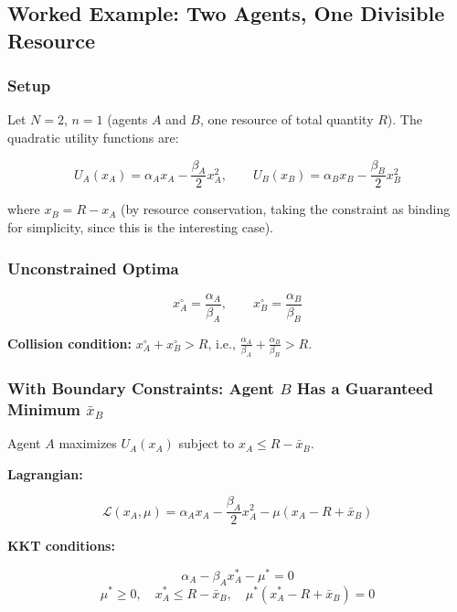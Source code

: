 \documentclass[11pt]{article}
\theoremstyle{plain}
\theoremstyle{definition}
\theoremstyle{remark}
\let\origsubsection\subsection
\renewcommand{\subsection}{\needspace{7\baselineskip}\origsubsection}
\let\origsubsubsection\subsubsection
\renewcommand{\subsubsection}{\needspace{4\baselineskip}\origsubsubsection}
\begin{document}
\subsection{Worked Example: Two Agents, One Divisible
Resource}\label{worked-example-two-agents-one-divisible-resource}

\subsubsection{Setup}\label{setup}

Let \(N = 2\), \(n = 1\) (agents \(A\) and \(B\), one resource of total
quantity \(R\)). The quadratic utility functions are:

\[U_A(x_A) = \alpha_A x_A - \frac{\beta_A}{2} x_A^2, \qquad U_B(x_B) = \alpha_B x_B - \frac{\beta_B}{2} x_B^2\]

where \(x_B = R - x_A\) (by resource conservation, taking the constraint
as binding for simplicity, since this is the interesting case).

\subsubsection{Unconstrained Optima}\label{unconstrained-optima}

\[x_A^{\circ} = \frac{\alpha_A}{\beta_A}, \qquad x_B^{\circ} = \frac{\alpha_B}{\beta_B}\]

\textbf{Collision condition:} \(x_A^{\circ} + x_B^{\circ} > R\), i.e.,
\(\frac{\alpha_A}{\beta_A} + \frac{\alpha_B}{\beta_B} > R\).

\subsubsection{\texorpdfstring{With Boundary Constraints: Agent \(B\)
Has a Guaranteed Minimum
\(\bar{x}_B\)}{With Boundary Constraints: Agent B Has a Guaranteed Minimum \textbackslash bar\{x\}\_B}}\label{with-boundary-constraints-agent-b-has-a-guaranteed-minimum-barx_b}

Agent \(A\) maximizes \(U_A(x_A)\) subject to
\(x_A \leq R - \bar{x}_B\).

\textbf{Lagrangian:}

\[\mathcal{L}(x_A, \mu) = \alpha_A x_A - \frac{\beta_A}{2} x_A^2 - \mu\left(x_A - R + \bar{x}_B\right)\]

\textbf{KKT conditions:}

\[\alpha_A - \beta_A x_A^* - \mu^* = 0\]
\[\mu^* \geq 0, \quad x_A^* \leq R - \bar{x}_B, \quad \mu^*(x_A^* - R + \bar{x}_B) = 0\]
\end{document}
